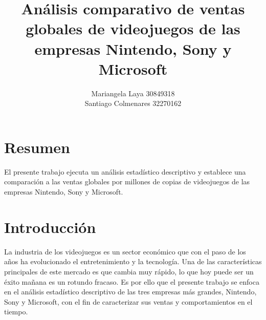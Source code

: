 \documentclass[oneside,11pt]{Latex/Classes/PhDthesisPSnPDF}
\title{Análisis comparativo de ventas globales de videojuegos de las
empresas Nintendo, Sony y Microsoft}
\author{Mariangela Laya 30849318 \\ Santiago Colmenares 32270162}
\begin{document}
\maketitle

\frontmatter


\setcounter{secnumdepth}{3}
\setcounter{tocdepth}{3}

\tableofcontents



\cleardoublepage

  \cleardoublepage       %
  \chapter*{Resumen}     %
  
  El presente trabajo ejecuta un análisis estadístico descriptivo y
establece una comparación a las ventas globales por millones de copias
de videojuegos de las empresas Nintendo, Sony y
Microsoft.             %
  
  \cleardoublepage

\mainmatter
\def\baselinestretch{1.5}

\chapter*{Introducción}

La industria de los videojuegos es un sector económico que con el paso
de los años ha evolucionado el entretenimiento y la tecnología. Una de
las características principales de este mercado es que cambia muy
rápido, lo que hoy puede ser un éxito mañana es un rotundo fracaso. Es
por ello que el presente trabajo se enfoca en el análisis estadístico
descriptivo de las tres empresas más grandes, Nintendo, Sony y
Microsoft, con el fin de caracterizar sus ventas y comportamientos en el
tiempo.
\end{document}
